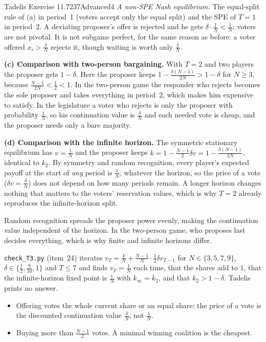 \begin{exsol}{Tadelis Exercise 11.7}{237}{Advanced}{4}
\emph{A non-SPE Nash equilibrium.} The equal-split rule of (a) in period~1 (voters accept only the equal split) and
the SPE of $T = 1$ in period~2. A deviating proposer's offer is rejected and he gets $\delta\cdot\frac1N < \frac1N$;
voters are not pivotal. It is not subgame perfect, for the same reason as before: a voter offered
$x_i > \frac\delta N$ rejects it, though waiting is worth only $\frac\delta N$.

\textbf{(c) Comparison with two-person bargaining.} With $T = 2$ and two players the proposer gets $1 - \delta$. Here the
proposer keeps $1 - \frac{\delta(N-1)}{2N} > 1 - \delta$ for $N \ge 3$, because $\frac{N-1}{2N} < \frac12 < 1$. In the
two-person game the responder who rejects becomes the sole proposer and takes everything in period~2, which makes him
expensive to satisfy. In the legislature a voter who rejects is only the proposer with probability $\frac1N$, so
his continuation value is $\frac\delta N$ and each needed vote is cheap, and the proposer needs only a bare
majority.

\textbf{(d) Comparison with the infinite horizon.} The symmetric stationary equilibrium has $v = \frac1N$ and the
proposer keeps $k = 1 - \frac{N-1}{2}\delta v = 1 - \frac{\delta(N-1)}{2N}$, identical to $k_2$. By symmetry and random
recognition, every player's expected payoff at the start of \emph{any} period is $\frac1N$, whatever the horizon, so the
price of a vote ($\delta v = \frac\delta N$) does not depend on how many periods remain. A longer horizon changes
nothing that matters to the voters' reservation values, which is why $T = 2$ already reproduces the infinite-horizon
split.

\interp Random recognition spreads the proposer power evenly, making the continuation value independent of the horizon.
In the two-person game, who proposes last decides everything, which is why finite and infinite horizons differ.

\verify \texttt{check\_T3.py} (item~24) iterates $v_T = \frac{k}{N} + \frac{N-1}{N}\cdot\frac12\delta v_{T-1}$ for
$N \in \{3,5,7,9\}$, $\delta \in \{\frac12, \frac9{10}, 1\}$ and $T \le 7$ and finds $v_T = \frac1N$ each time, that the
shares add to $1$, that the infinite-horizon fixed point is $\frac1N$ with $k_\infty = k_2$, and that $k_2 > 1 - \delta$.
Tadelis prints no answer.

\mistakes
\begin{itemize}
  \item Offering votes the whole current share or an equal share: the price of a vote is the discounted continuation
  value $\frac\delta N$, not $\frac1N$.
  \item Buying more than $\frac{N-1}{2}$ votes. A minimal winning coalition is the cheapest.
\end{itemize}


\end{exsol}
